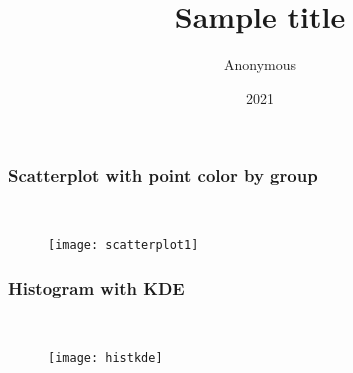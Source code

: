 \documentclass[border=5mm, convert, usenames, dvipsnames,beamer]{standalone}
\title{Sample title}
\author{Anonymous}
\institute{Overleaf}
\date{2021}
\begin{document}
\begin{frame}[ fragile]{}
\frametitle{Scatterplot with point color by group}

\

\vspace{1mm}
\noindent
\begin{figure}[h!]
\begin{center}
\texttt{[image: scatterplot1]}
\caption{}
\end{center}
\end{figure}
\end{frame}




\begin{frame}[ fragile]{}
\frametitle{Histogram with KDE}

\

\vspace{1mm}
\noindent
\begin{figure}[h!]
\begin{center}
\texttt{[image: histkde]}
\caption{}
\end{center}
\end{figure}
\end{frame}
\end{document}
